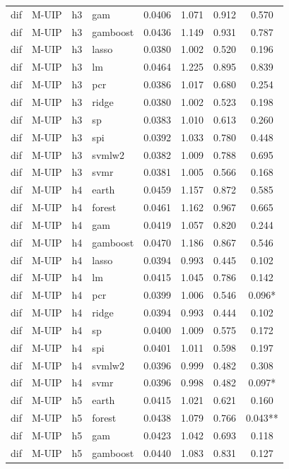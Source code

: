 \begin{ThreePartTable}
\begin{longtable}[t]{llclcccc}
dif & M-UIP & h3 & gam & 0.0406 & 1.071 & 0.912 & 0.570\\
dif & M-UIP & h3 & gamboost & 0.0436 & 1.149 & 0.931 & 0.787\\
dif & M-UIP & h3 & lasso & 0.0380 & 1.002 & 0.520 & 0.196\\
dif & M-UIP & h3 & lm & 0.0464 & 1.225 & 0.895 & 0.839\\
dif & M-UIP & h3 & pcr & 0.0386 & 1.017 & 0.680 & 0.254\\
dif & M-UIP & h3 & ridge & 0.0380 & 1.002 & 0.523 & 0.198\\
dif & M-UIP & h3 & sp & 0.0383 & 1.010 & 0.613 & 0.260\\
dif & M-UIP & h3 & spi & 0.0392 & 1.033 & 0.780 & 0.448\\
dif & M-UIP & h3 & svmlw2 & 0.0382 & 1.009 & 0.788 & 0.695\\
dif & M-UIP & h3 & svmr & 0.0381 & 1.005 & 0.566 & 0.168\\
\addlinespace
dif & M-UIP & h4 & earth & 0.0459 & 1.157 & 0.872 & 0.585\\
dif & M-UIP & h4 & forest & 0.0461 & 1.162 & 0.967 & 0.665\\
dif & M-UIP & h4 & gam & 0.0419 & 1.057 & 0.820 & 0.244\\
dif & M-UIP & h4 & gamboost & 0.0470 & 1.186 & 0.867 & 0.546\\
dif & M-UIP & h4 & lasso & 0.0394 & 0.993 & 0.445 & 0.102\\
dif & M-UIP & h4 & lm & 0.0415 & 1.045 & 0.786 & 0.142\\
dif & M-UIP & h4 & pcr & 0.0399 & 1.006 & 0.546 & 0.096*\\
dif & M-UIP & h4 & ridge & 0.0394 & 0.993 & 0.444 & 0.102\\
dif & M-UIP & h4 & sp & 0.0400 & 1.009 & 0.575 & 0.172\\
dif & M-UIP & h4 & spi & 0.0401 & 1.011 & 0.598 & 0.197\\
dif & M-UIP & h4 & svmlw2 & 0.0396 & 0.999 & 0.482 & 0.308\\
dif & M-UIP & h4 & svmr & 0.0396 & 0.998 & 0.482 & 0.097*\\
\addlinespace
dif & M-UIP & h5 & earth & 0.0415 & 1.021 & 0.621 & 0.160\\
dif & M-UIP & h5 & forest & 0.0438 & 1.079 & 0.766 & 0.043**\\
dif & M-UIP & h5 & gam & 0.0423 & 1.042 & 0.693 & 0.118\\
dif & M-UIP & h5 & gamboost & 0.0440 & 1.083 & 0.831 & 0.127\\

\end{longtable}
\end{ThreePartTable}
